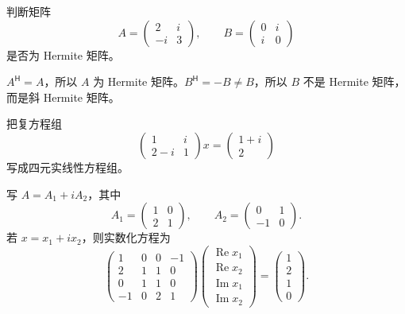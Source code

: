 \begin{exercise}[level=basic]
判断矩阵
\[
A=\begin{pmatrix}2&i\\-i&3\end{pmatrix},
\qquad
B=\begin{pmatrix}0&i\\i&0\end{pmatrix}
\]
是否为 Hermite 矩阵。
\begin{solution}
$A^{\mathsf H}=A$，所以 $A$ 为 Hermite 矩阵。$B^{\mathsf H}=-B\ne B$，所以 $B$ 不是 Hermite 矩阵，而是斜 Hermite 矩阵。
\end{solution}
\end{exercise}

\begin{exercise}[level=basic]
把复方程组
\[
\begin{pmatrix}1&i\\2-i&1\end{pmatrix}x
=\begin{pmatrix}1+i\\2\end{pmatrix}
\]
写成四元实线性方程组。
\begin{solution}
写 $A=A_1+iA_2$，其中
\[
A_1=\begin{pmatrix}1&0\\2&1\end{pmatrix},
\qquad
A_2=\begin{pmatrix}0&1\\-1&0\end{pmatrix}.
\]
若 $x=x_1+ix_2$，则实数化方程为
\[
\begin{pmatrix}
1&0&0&-1\\
2&1&1&0\\
0&1&1&0\\
-1&0&2&1
\end{pmatrix}
\begin{pmatrix}\operatorname{Re}x_1\\\operatorname{Re}x_2\\
\operatorname{Im}x_1\\\operatorname{Im}x_2\end{pmatrix}
=\begin{pmatrix}1\\2\\1\\0\end{pmatrix}.
\]
\end{solution}
\end{exercise}

